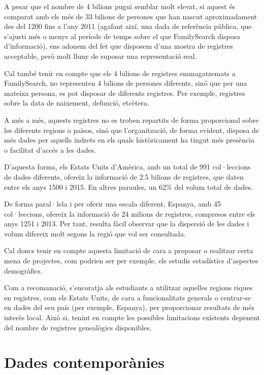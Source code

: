     A pesar que el nombre de 4 bilions pugui semblar molt elevat, si aquest és comparat amb els més de 33 bilions de persones que han nascut aproximadament des del 1200 fins a l'any 2011 (agafant així, una dada de referència pública, que s'ajusti més o menys al període de temps sobre el que FamilySearch disposa d'informació), ens adonem del fet que disposem d'una mostra de registres acceptable, però molt lluny de suposar una representació real.

    Cal també tenir en compte que els 4 bilions de registres emmagatzemats a Family\-Search, no representen 4 bilions de persones diferents, sinó que per una mateixa persona, es pot disposar de diferents registres. Per exemple, registres sobre la data de naixement, defunció, etcètera.

    A més a més, aquests registres no es troben repartits de forma proporcional sobre les diferents regions o països, sinó que l'organització, de forma evident, disposa de més dades per aquells indrets en els quals històricament ha tingut més presència o facilitat d'accés a les dades.

     D'aquesta forma, els Estats Units d'Amèrica, amb un total de 991 col·leccions de dades diferents, ofereix la informació de 2.5 bilions de registres, que daten entre els anys 1500 i 2015. En altres paraules, un 62\% del volum total de dades.

     De forma paral·lela i per oferir una escala diferent, Espanya, amb 45 col·leccions, ofereix la informació de 24 milions de registres, compresos entre els anys 1251 i 2013. Per tant, resulta fàcil observar que la dispersió de les dades i volum difereix molt segons la regió que vol ser consultada.

     Cal doncs tenir en compte aquesta limitació de cara a proposar o realitzar certa mena de projectes, com podrien ser per exemple, els estudis estadístics d'aspectes demogràfics.

     Com a recomanació, s'encoratja als estudiants a utilitzar aquelles regions riques en registres, com els Estats Units, de cara a funcionalitats generals o centrar-se en dades del seu país (per exemple, Espanya), per proporcionar resultats de més interès local. Això si, tenint en compte les possibles limitacions existents depenent del nombre de registres genealògics disponibles.


 \section{Dades contemporànies}

